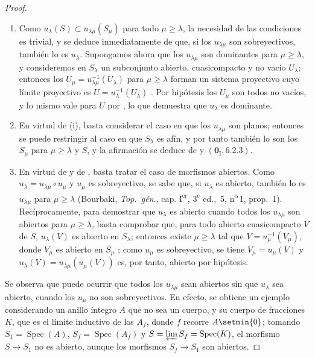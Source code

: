 \begin{proof}
\begin{enumerate}[label=(\roman*)]
   \item Como $u_\lambda(S)\subset u_{\lambda\mu}(S_\mu)$ para todo $\mu\geq\lambda$, la necesidad de las condiciones es trivial, y se deduce inmediatamente de  que, si los $u_{\lambda\mu}$ son sobreyectivos, también lo es $u_\lambda$.
Supongamos ahora que los $u_{\lambda\mu}$ son dominantes para $\mu\geq\lambda$, y consideremos en $S_\lambda$ un subconjunto abierto, cuasicompacto y no vacío $U_\lambda$; entonces los $U_\mu=u_{\lambda\mu}^{-1}(U_\lambda)$ para $\mu\geq\lambda$ forman un sistema proyectivo cuyo límite proyectivo es $U=u_\lambda^{-1}(U_\lambda)$ .
Por hipótesis los $U_\mu$ son todos no vacíos, y lo mismo vale para $U$ por , lo que demuestra que $u_\lambda$ es dominante.

   \item En virtud de (i), basta considerar el caso en que los $u_{\lambda\mu}$ son planos; entonces se puede restringir al caso en que $S_\lambda$ es afín, y por tanto también lo son los $S_\mu$ para $\mu\geq\lambda$ y $S$, y la afirmación se deduce de  y $(\mathbf{0}_{\mathrm I},6.2.3)$.

   \item En virtud de  y de , basta tratar el caso de morfismos abiertos.
Como $u_\lambda=u_{\lambda\mu}\circ u_\mu$ y $u_\mu$ es sobreyectivo, se sabe que, si $u_\lambda$ es abierto, también lo es $u_{\lambda\mu}$ para $\mu\geq\lambda$ (Bourbaki, \emph{Top.\ g\'en.}, cap. $\mathrm I^{\mathrm{er}}$, $3^{\mathrm e}$ ed., \textsection\,5, n\textsuperscript{o}\,1, prop.~1).
Recíprocamente, para demostrar que $u_\lambda$ es abierto cuando todos los $u_{\lambda\mu}$ son abiertos para $\mu\geq\lambda$, basta comprobar que, para todo abierto cuasicompacto $V$ de $S$, $u_\lambda(V)$ es abierto en $S_\lambda$; entonces existe $\mu\geq\lambda$ tal que $V=u_\mu^{-1}(V_\mu)$, donde $V_\mu$ es abierto en $S_\mu$ ; como $u_\mu$ es sobreyectivo, se tiene $V_\mu=u_\mu(V)$ y $u_\lambda(V)=u_{\lambda\mu}(u_\mu(V))$ es, por tanto, abierto por hipótesis.
\end{enumerate}

Se observa que puede ocurrir que todos los $u_{\lambda\mu}$ sean abiertos sin que $u_\lambda$ sea abierto, cuando los $u_\mu$ no son sobreyectivos.
En efecto, se obtiene un ejemplo considerando un anillo íntegro $A$ que no sea un cuerpo, y su cuerpo de fracciones $K$, que es el límite inductivo de los $A_f$, donde $f$ recorre $A\setmin\{0\}$; tomando $S_1=\operatorname{Spec}(A)$, $S_f=\operatorname{Spec}(A_f)$ y $S=\varprojlim S_f=\operatorname{Spec}(K)$, el morfismo $S\to S_1$ no es abierto, aunque los morfismos $S_f\to S_1$ son abiertos.
\end{proof}

